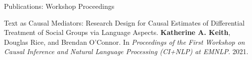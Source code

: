 \documentclass{resume} %
\begin{document}
\begin{rSection}{Publications: Workshop Proceedings}
\begin{etaremune}
\item Text as Causal Mediators: Research Design for Causal Estimates of Differential Treatment of Social Groups via Language Aspects. \textbf{Katherine A. Keith}, Douglas Rice, and Brendan O'Connor. In \emph{Proceedings of the First Workshop on Causal Inference and Natural Language Processing (CI+NLP) at EMNLP}. 2021.  
\end{etaremune}

\end{rSection}



\end{document}
